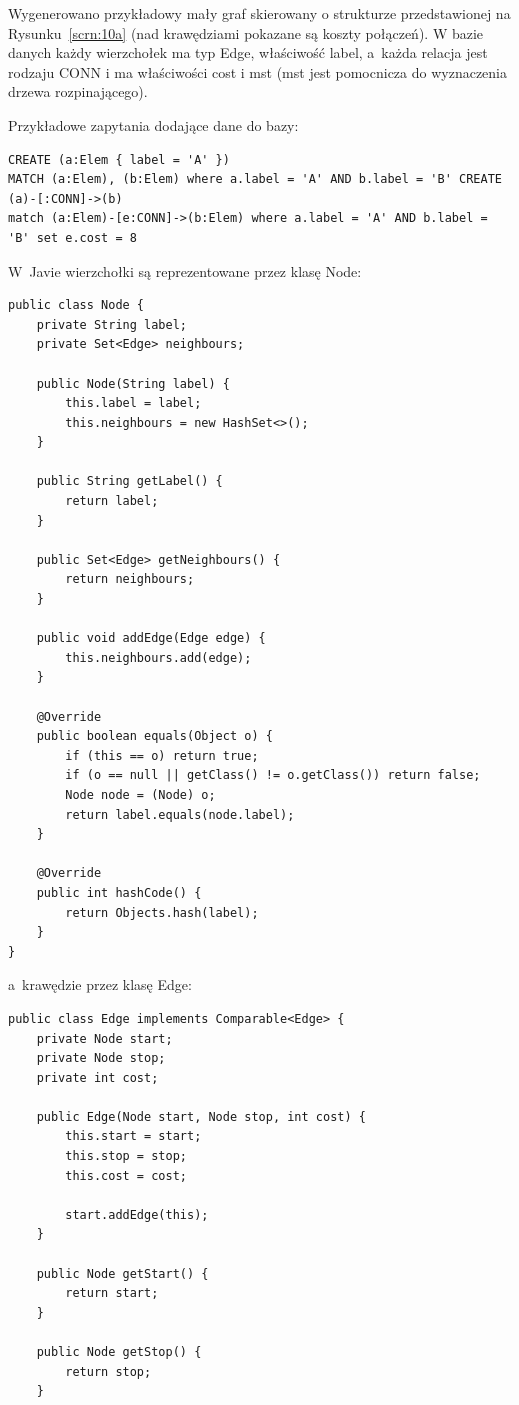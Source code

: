 \documentclass[a4paper,9pt]{extarticle}	%
\begin{document}
\begin{enumerate}
Wygenerowano przykładowy mały graf skierowany o strukturze przedstawionej na Rysunku~\ref{scrn:10a} (nad krawędziami pokazane są koszty połączeń). W bazie danych każdy wierzchołek ma typ Edge, właściwość label, a~każda relacja jest rodzaju CONN i ma właściwości cost i mst (mst jest pomocnicza do wyznaczenia drzewa rozpinającego). 

Przykładowe zapytania dodające dane do bazy:
\begin{lstlisting}
CREATE (a:Elem { label = 'A' })
MATCH (a:Elem), (b:Elem) where a.label = 'A' AND b.label = 'B' CREATE (a)-[:CONN]->(b)
match (a:Elem)-[e:CONN]->(b:Elem) where a.label = 'A' AND b.label = 'B' set e.cost = 8
\end{lstlisting}

W~Javie wierzchołki są reprezentowane przez klasę Node:
\begin{lstlisting}
public class Node {
    private String label;
    private Set<Edge> neighbours;

    public Node(String label) {
        this.label = label;
        this.neighbours = new HashSet<>();
    }

    public String getLabel() {
        return label;
    }

    public Set<Edge> getNeighbours() {
        return neighbours;
    }

    public void addEdge(Edge edge) {
        this.neighbours.add(edge);
    }

    @Override
    public boolean equals(Object o) {
        if (this == o) return true;
        if (o == null || getClass() != o.getClass()) return false;
        Node node = (Node) o;
        return label.equals(node.label);
    }

    @Override
    public int hashCode() {
        return Objects.hash(label);
    }
}
\end{lstlisting}

a~krawędzie przez klasę Edge:
\begin{lstlisting}
public class Edge implements Comparable<Edge> {
    private Node start;
    private Node stop;
    private int cost;

    public Edge(Node start, Node stop, int cost) {
        this.start = start;
        this.stop = stop;
        this.cost = cost;

        start.addEdge(this);
    }

    public Node getStart() {
        return start;
    }

    public Node getStop() {
        return stop;
    }


\end{lstlisting}
\end{enumerate}
\end{document}
